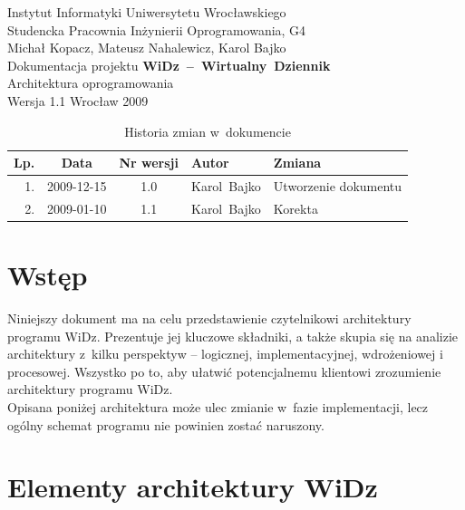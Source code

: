 \documentclass[12pt,leqno,twoside]{mwart}
\begin{document}
\begin{titlepage}
\begin{center}
Instytut Informatyki Uniwersytetu Wrocławskiego \\
Studencka Pracownia Inżynierii Oprogramowania, G4 \\
\vspace{4cm}
\Large Michał Kopacz, Mateusz Nahalewicz, Karol Bajko \\
\vspace{0.5cm}
\huge Dokumentacja projektu \mbox{\textbf{WiDz -- Wirtualny Dziennik}} \\ \Large Architektura oprogramowania\\
\vspace{1cm}
\normalsize Wersja 1.1
\vfill
\normalsize Wrocław 2009
\end{center}
\end{titlepage}

\newpage
\vfill
\renewcommand*{\tablename}{Tabela}
\begin{table}
	\centering
	\caption{Historia zmian w~dokumencie}
		\begin{tabular}{|r|c|c|p{}|l|}
		\hline
		Lp. 	& Data       & Nr wersji 	& Autor           		& Zmiana \\ \hline
		1.   	& 2009-12-15 & 1.0       	& \mbox{Karol Bajko} & Utworzenie dokumentu \\ \hline
		2.   	& 2009-01-10 & 1.1       	& \mbox{Karol Bajko} & Korekta \\ \hline
		\end{tabular}
\end{table}

\tableofcontents
\newpage

\section{Wstęp}
\noindent Niniejszy dokument ma na celu przedstawienie czytelnikowi architektury programu WiDz. Prezentuje jej kluczowe składniki, a także skupia się na analizie architektury z~kilku perspektyw -- logicznej, implementacyjnej, wdrożeniowej i procesowej. Wszystko po to, aby ułatwić potencjalnemu klientowi zrozumienie architektury programu WiDz.\\
\indent Opisana poniżej architektura może ulec zmianie w~fazie implementacji, lecz ogólny schemat programu nie powinien zostać naruszony.

\section{Elementy architektury WiDz}
\end{document}
